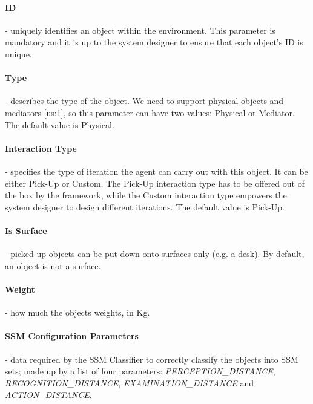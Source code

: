 \paragraph{ID} - uniquely identifies an object within the environment. This parameter is mandatory and it is up to the system designer to ensure that each object's ID is unique.

\paragraph{Type} - describes the type of the object. We need to support physical objects and mediators \ref{us:1}, so this parameter can have two values: Physical or Mediator. The default value is Physical.

\paragraph{Interaction Type} - specifies the type of iteration the agent can carry out with this object. It can be either Pick-Up or Custom. The Pick-Up interaction type has to be offered out of the box by the framework, while the Custom interaction type empowers the system designer to design different iterations. The default value is Pick-Up.

\paragraph{Is Surface} - picked-up objects can be put-down onto surfaces only (e.g. a desk). By default, an object is not a surface.

\paragraph{Weight} - how much the objects weights, in Kg.

\paragraph{SSM Configuration Parameters} - data required by the SSM Classifier to correctly classify the objects into SSM sets; made up by a list of four parameters: \emph{PERCEPTION\_DISTANCE}, \emph{RECOGNITION\_DISTANCE}, \emph{EXAMINATION\_DISTANCE} and \emph{ACTION\_DISTANCE}.
